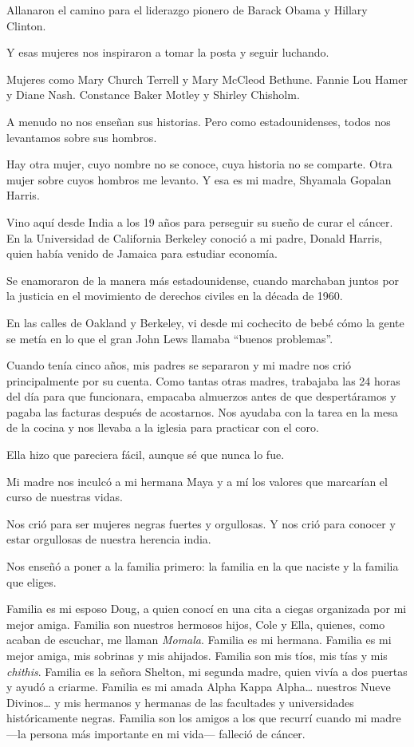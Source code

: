 Allanaron el camino para el liderazgo pionero de Barack Obama y Hillary
Clinton.

Y esas mujeres nos inspiraron a tomar la posta y seguir luchando.

Mujeres como Mary Church Terrell y Mary McCleod Bethune. Fannie Lou
Hamer y Diane Nash. Constance Baker Motley y Shirley Chisholm.

A menudo no nos enseñan sus historias. Pero como estadounidenses, todos
nos levantamos sobre sus hombros.

Hay otra mujer, cuyo nombre no se conoce, cuya historia no se comparte.
Otra mujer sobre cuyos hombros me levanto. Y esa es mi madre, Shyamala
Gopalan Harris.

Vino aquí desde India a los 19 años para perseguir su sueño de curar el
cáncer. En la Universidad de California Berkeley conoció a mi padre,
Donald Harris, quien había venido de Jamaica para estudiar economía.

Se enamoraron de la manera más estadounidense, cuando marchaban juntos
por la justicia en el movimiento de derechos civiles en la década de
1960.

En las calles de Oakland y Berkeley, vi desde mi cochecito de bebé cómo
la gente se metía en lo que el gran John Lews llamaba ``buenos
problemas''.

Cuando tenía cinco años, mis padres se separaron y mi madre nos crió
principalmente por su cuenta. Como tantas otras madres, trabajaba las 24
horas del día para que funcionara, empacaba almuerzos antes de que
despertáramos y pagaba las facturas después de acostarnos. Nos ayudaba
con la tarea en la mesa de la cocina y nos llevaba a la iglesia para
practicar con el coro.

Ella hizo que pareciera fácil, aunque sé que nunca lo fue.

Mi madre nos inculcó a mi hermana Maya y a mí los valores que marcarían
el curso de nuestras vidas.

Nos crió para ser mujeres negras fuertes y orgullosas. Y nos crió para
conocer y estar orgullosas de nuestra herencia india.

Nos enseñó a poner a la familia primero: la familia en la que naciste y
la familia que eliges.

Familia es mi esposo Doug, a quien conocí en una cita a ciegas
organizada por mi mejor amiga. Familia son nuestros hermosos hijos, Cole
y Ella, quienes, como acaban de escuchar, me llaman \emph{Momala}.
Familia es mi hermana. Familia es mi mejor amiga, mis sobrinas y mis
ahijados. Familia son mis tíos, mis tías y mis \emph{chithis}. Familia
es la señora Shelton, mi segunda madre, quien vivía a dos puertas y
ayudó a criarme. Familia es mi amada Alpha Kappa Alpha\ldots{} nuestros
Nueve Divinos\ldots{} y mis hermanos y hermanas de las facultades y
universidades históricamente negras. Familia son los amigos a los que
recurrí cuando mi madre ---la persona más importante en mi vida---
falleció de cáncer.

